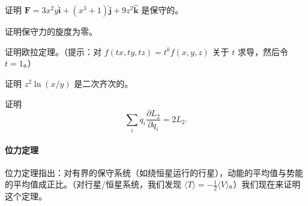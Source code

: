 \begin{example}
证明 $\mathbf{F} = 3x^2y\hat{\mathbf{i}} + (x^3 + 1)\hat{\mathbf{j}} + 9z^2\hat{\mathbf{k}}$ 是保守的。
\end{example}

\begin{example}
证明保守力的旋度为零。
\end{example}

\begin{example}
证明欧拉定理。（提示：对 $f(tx, ty, tz) = t^k f(x, y, z)$ 关于 $t$ 求导，然后令 $t = 1$。）
\end{example}

\begin{example}
证明 $z^2\ln(x/y)$ 是二次齐次的。
\end{example}

\begin{example}
证明
$$\sum_i\dot{q}_i\frac{\partial L_2}{\partial \dot{q}_i} = 2L_2.$$
\end{example}

\paragraph{位力定理}
位力定理指出：对有界的保守系统（如绕恒星运行的行星），动能的平均值与势能的平均值成正比。（对行星/恒星系统，我们发现 $\langle T\rangle = -\frac{1}{2}\langle V\rangle$。）我们现在来证明这个定理。

